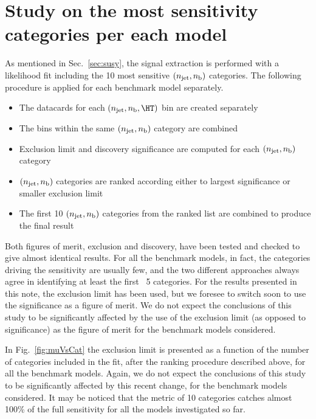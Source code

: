 \section{Study on the most sensitivity categories per each model}
\label{sec:sensitivity-study}
As mentioned in Sec.~\ref{sec:susy}, the signal extraction is performed with a likelihood fit including the 
10 most sensitive $(n_{\text{jet}},n_{\text{b}})$ categories. 
The following procedure is applied for each benchmark model separately.

\begin{itemize}
\item The datacards for each $(\njet,\nb,\HT)$ bin are created separately
\item The \HT bins within the same $(n_{\text{jet}},n_{\text{b}})$ category are combined
\item Exclusion limit and discovery significance are computed for each $(n_{\text{jet}},n_{\text{b}})$ category
\item $(n_{\text{jet}},n_{\text{b}})$ categories are ranked according either to largest significance or smaller exclusion limit
\item The first 10 $(n_{\text{jet}},n_{\text{b}})$ categories from the ranked list are combined to produce the final result
\end{itemize}

Both figures of merit, exclusion and discovery, have been tested and checked to give almost identical results. 
For all the benchmark models, in fact, the categories driving the sensitivity are usually few, 
and the two different approaches always agree in identifying at least the first ~5 categories. 
For the results presented in this note, the exclusion limit has been used, but we foresee to switch soon 
to use the significance as a figure of merit. 
We do not expect the conclusions of this study to be significantly
affected by the use of the exclusion limit (as opposed to
significance) as the figure of merit for the benchmark models
considered.

In Fig.~\ref{fig:muVsCat} the exclusion limit is presented as a function of the number of categories 
included in the fit, after the ranking procedure described above, for all the benchmark models. 
Again, we do
not expect the conclusions of this study to be significantly affected
by this recent change, for the benchmark models considered. 
It may be noticed that the metric of 10 categories catches almost 100\% of the full sensitivity 
for all the models investigated so far.

